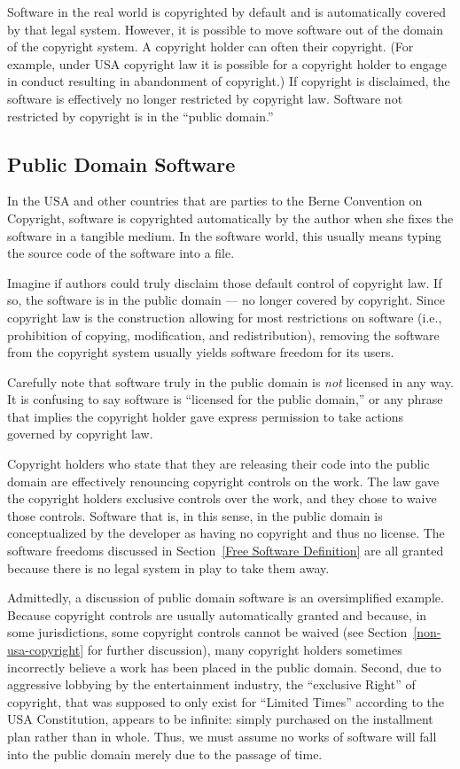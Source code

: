 Software in the real world is copyrighted by default and is automatically
covered by that legal system.  However, it is possible to move software out
of the domain of the copyright system.  A copyright holder can often
 their copyright. (For example, under USA copyright law
it is possible for a copyright holder to engage in conduct resulting
in abandonment of copyright.)  If copyright is disclaimed, the software is
effectively no longer restricted by copyright law.   Software not restricted by copyright is in the
``public domain.''

\subsection{Public Domain Software}

In the USA and other countries that
are parties to the Berne Convention on Copyright, software is copyrighted
automatically by the author when she fixes the software in a tangible
medium.  In the software world, this usually means typing the source code
of the software into a file.

Imagine if authors could truly disclaim those default control of copyright
law.  If so, the software is in the public domain --- no longer covered by
copyright.  Since copyright law is the construction allowing for most
restrictions on software (i.e., prohibition of copying, modification, and
redistribution), removing the software from the copyright system usually
yields software freedom for its users.

Carefully note that software truly in the public domain is \emph{not} licensed
in any way.  It is confusing to say software is ``licensed for the
public domain,'' or any phrase that implies the copyright holder gave
express permission to take actions governed by copyright law.

Copyright holders who state that they are releasing their code into
the public domain are effectively renouncing copyright controls on
the work.  The law gave the copyright holders exclusive controls over the
work, and they chose to waive those controls.  Software that is, in
this sense, in the public domain
is conceptualized by the developer as having no copyright and thus no license. The software freedoms discussed in
Section~\ref{Free Software Definition} are all granted because there is no
legal system in play to take them away.

Admittedly, a discussion of public domain software is an oversimplified
example.  
Because copyright controls are usually automatically granted and because, in
some jurisdictions, some copyright controls cannot be waived (see
Section~\ref{non-usa-copyright} for further discussion), many copyright
holders sometimes incorrectly believe a work has been placed in the public
domain.  Second, due to aggressive lobbying by the entertainment industry,
the ``exclusive Right'' of copyright, that was supposed to only exist for
``Limited Times'' according to the USA Constitution, appears to be infinite:
simply purchased on the installment plan rather than in whole.  Thus, we must
assume no works of software will fall into the public domain merely due to
the passage of time.

